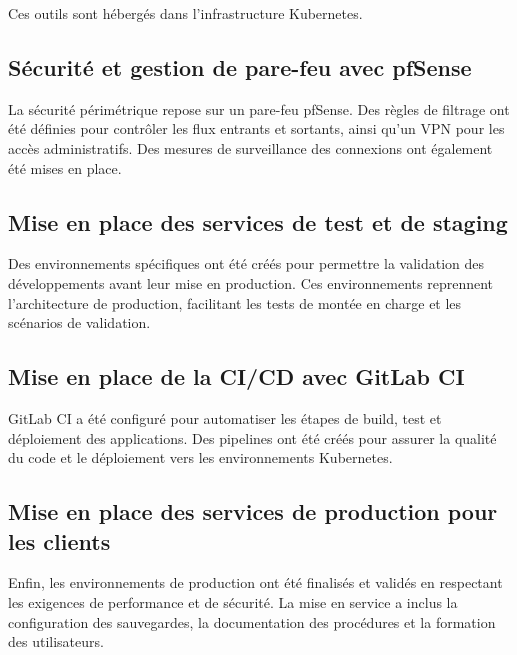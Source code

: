 Ces outils sont hébergés dans l’infrastructure Kubernetes.

\subsection{Sécurité et gestion de pare-feu avec pfSense}

La sécurité périmétrique repose sur un pare-feu pfSense. Des règles de filtrage ont été définies pour contrôler les flux entrants et sortants, ainsi qu’un VPN pour les accès administratifs. Des mesures de surveillance des connexions ont également été mises en place.

\subsection{Mise en place des services de test et de staging}

Des environnements spécifiques ont été créés pour permettre la validation des développements avant leur mise en production. Ces environnements reprennent l’architecture de production, facilitant les tests de montée en charge et les scénarios de validation.

\subsection{Mise en place de la CI/CD avec GitLab CI}

GitLab CI a été configuré pour automatiser les étapes de build, test et déploiement des applications. Des pipelines ont été créés pour assurer la qualité du code et le déploiement vers les environnements Kubernetes.

\subsection{Mise en place des services de production pour les clients}

Enfin, les environnements de production ont été finalisés et validés en respectant les exigences de performance et de sécurité. La mise en service a inclus la configuration des sauvegardes, la documentation des procédures et la formation des utilisateurs.

